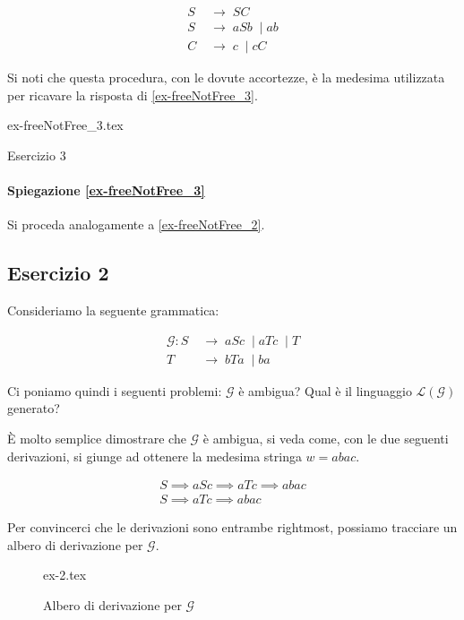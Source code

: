 \documentclass[class=book, crop=false, oneside, 12pt]{standalone}
\begin{document}
\begin{align*}
  S\; & \to\; SC \\
  S\; & \to\; aSb\; \mid ab \\
  C\; & \to\; c\; \mid cC
\end{align*}

\noindent Si noti che questa procedura, con le dovute accortezze, è la medesima utilizzata per ricavare la risposta di \ref{ex-freeNotFree_3}.

\begin{table}[H]
	\centering
	{ex-freeNotFree_3.tex}
    \caption{Esercizio 3}
    \label{ex-freeNotFree_3}
\end{table}

\paragraph{Spiegazione \ref{ex-freeNotFree_3}}
Si proceda analogamente a \ref{ex-freeNotFree_2}.

\subsection*{Esercizio 2}
Consideriamo la seguente grammatica:

\begin{align*}
  \mathcal{G}:  S\; & \to\;  aSc\; \mid aTc\; \mid T \\
   T\; & \to\; bTa\; \mid ba
\end{align*}

\noindent Ci poniamo quindi i seguenti problemi: \(\mathcal{G}\) è ambigua? Qual è il linguaggio \(\mathcal{L(G)}\) generato?

È molto semplice dimostrare che \(\mathcal{G}\) è ambigua, si veda come, con le due seguenti derivazioni, si giunge ad ottenere la medesima stringa \(w = abac\).

\begin{gather*}
  S \implies aSc \implies aTc \implies abac \\
  S \implies aTc \implies abac
\end{gather*}

\noindent Per convincerci che le derivazioni sono entrambe rightmost, possiamo tracciare un albero di derivazione per \(\mathcal{G}\).

\begin{figure}[H]
	\centering
	{ex-2.tex}
	\caption{Albero di derivazione per \(\mathcal{G}\)}
\end{figure}
\end{document}
